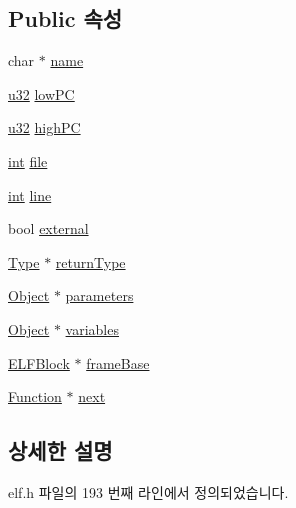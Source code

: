 \subsection*{Public 속성}
\begin{DoxyCompactItemize}
\item 
char $\ast$ \mbox{\hyperlink{struct_function_afc3b67aebc6b6c91044c6b09d7279eb0}{name}}
\item 
\mbox{\hyperlink{_system_8h_a10e94b422ef0c20dcdec20d31a1f5049}{u32}} \mbox{\hyperlink{struct_function_acfcfc3e0b585bafa5690e3edf8936d87}{low\+PC}}
\item 
\mbox{\hyperlink{_system_8h_a10e94b422ef0c20dcdec20d31a1f5049}{u32}} \mbox{\hyperlink{struct_function_ac2bb5cba39265122d94851eba25eb5d6}{high\+PC}}
\item 
\mbox{\hyperlink{_util_8cpp_a0ef32aa8672df19503a49fab2d0c8071}{int}} \mbox{\hyperlink{struct_function_a09b77b9d9601b328d7127c62ed93d850}{file}}
\item 
\mbox{\hyperlink{_util_8cpp_a0ef32aa8672df19503a49fab2d0c8071}{int}} \mbox{\hyperlink{struct_function_a5b0b91c925b133e7eb1f0cae96f7aecc}{line}}
\item 
bool \mbox{\hyperlink{struct_function_ad775b69acac9b0efaea721d30d48afe5}{external}}
\item 
\mbox{\hyperlink{struct_type}{Type}} $\ast$ \mbox{\hyperlink{struct_function_ac0e42dfc7467e114a2a55005bd5549e2}{return\+Type}}
\item 
\mbox{\hyperlink{struct_object}{Object}} $\ast$ \mbox{\hyperlink{struct_function_a54c66e528d60629f16233e5690e46863}{parameters}}
\item 
\mbox{\hyperlink{struct_object}{Object}} $\ast$ \mbox{\hyperlink{struct_function_af68017d9a2b267a45154499c26ee981d}{variables}}
\item 
\mbox{\hyperlink{struct_e_l_f_block}{E\+L\+F\+Block}} $\ast$ \mbox{\hyperlink{struct_function_af5d7f2b7322272714f24ca36b2199c12}{frame\+Base}}
\item 
\mbox{\hyperlink{struct_function}{Function}} $\ast$ \mbox{\hyperlink{struct_function_a20ace60d6eba6736e143166b0137b87f}{next}}
\end{DoxyCompactItemize}


\subsection{상세한 설명}


elf.\+h 파일의 193 번째 라인에서 정의되었습니다.



